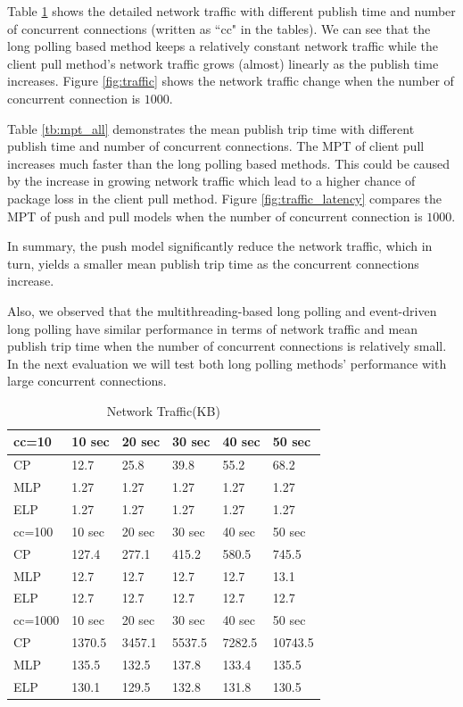Table \ref{tb:traffic} shows the detailed network traffic with different 
publish time and number of concurrent connections (written as ``cc" 
in the tables).  We can see that the long polling based method keeps 
a relatively constant network traffic while the client pull method's 
network traffic grows (almost) linearly as the publish time increases.
Figure \ref{fig:traffic} shows the network traffic change when the number 
of concurrent connection is $1000$.

Table \ref{tb:mpt_all} demonstrates the mean publish trip time with 
different publish time and number of concurrent connections. The MPT of
client pull increases much faster than the long polling based methods.
This could be caused by the increase in growing network traffic which lead to a 
higher chance of package loss in the client pull method. 
Figure \ref{fig:traffic_latency} compares the MPT of push and pull models when 
the number of concurrent connection is $1000$.

In summary, the push model significantly reduce the network traffic, which in
turn, yields a smaller mean publish trip time as the concurrent connections 
increase. 

Also, we observed that the multithreading-based long polling and event-driven long 
polling have similar performance in terms of network traffic and mean publish
trip time when the number of concurrent connections is relatively small. In the 
next evaluation we will test both long polling methods' performance with large 
concurrent connections.

\begin{table}
\centering \caption{\label{tb:traffic} Network Traffic(KB)}
\begin{tabular}{|l|l|l|l|l|l|}
    \hline cc=10& 10 sec & 20 sec & 30 sec & 40 sec & 50 sec \\
    \hline CP & 12.7 & 25.8 & 39.8 & 55.2 & 68.2 \\
    \hline MLP & 1.27 & 1.27 & 1.27 & 1.27 & 1.27 \\
    \hline ELP & 1.27 & 1.27 & 1.27 & 1.27 & 1.27 \\
    \hline
    \hline cc=100& 10 sec & 20 sec & 30 sec & 40 sec & 50 sec \\
    \hline CP & 127.4 & 277.1 & 415.2 & 580.5 & 745.5 \\
    \hline MLP & 12.7 & 12.7 & 12.7 & 12.7 & 13.1 \\
    \hline ELP & 12.7 & 12.7 & 12.7 & 12.7 & 12.7 \\
    \hline
    \hline cc=1000 & 10 sec & 20 sec & 30 sec & 40 sec & 50 sec \\
    \hline CP & 1370.5 & 3457.1 & 5537.5 & 7282.5 & 10743.5 \\
    \hline MLP & 135.5 & 132.5 & 137.8 & 133.4 & 135.5 \\
    \hline ELP & 130.1 & 129.5 & 132.8 & 131.8 & 130.5 \\
    \hline
\end{tabular}
\end{table}


